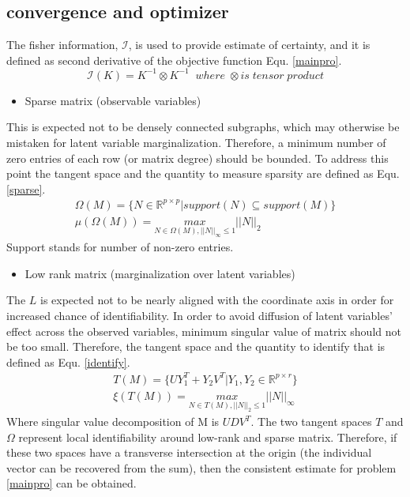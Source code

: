 \documentclass[10pt,conference]{IEEEtran}
\begin{document}
\subsection{convergence and optimizer}
\label{converge}
The fisher information, $\mathcal{I}$, is used to provide estimate of certainty, and it is defined as second derivative of the objective function Equ. \ref{mainpro}.
\begin{equation} \nonumber
    \mathcal{I} (K) = K^{-1} \otimes K^{-1} \;\; where \; \otimes is \; tensor\; product
\end{equation}
\begin{itemize}
\item Sparse matrix (observable variables)
\end{itemize}
This is expected not to be densely connected subgraphs, which may otherwise be mistaken for latent variable marginalization. Therefore, a minimum number of zero entries of each row (or matrix degree) should be bounded. To address this point the tangent space and the quantity to measure sparsity are defined as Equ. \ref{sparse}.
\begin{align}
    \Omega(M) = \{ N \in  \mathbb{R}^{p \times p} |  support(N) \subseteq support(M)\}\nonumber\\
    \mu(\Omega(M)) = \underset{N \in \Omega(M), ||N||_{\infty} \leq 1}{max} || N ||_{2} \label{sparse}
\end{align}
Support stands for number of non-zero entries.
\begin{itemize}
\item Low rank matrix (marginalization over latent variables)
\end{itemize}
The $L$ is expected not to be nearly aligned with the coordinate axis in order for increased chance of identifiability. In order to avoid diffusion of latent variables' effect across the observed variables, minimum singular value of matrix should not be too small. Therefore, the tangent space and the quantity to identify that is defined as Equ. \ref{identify}.
\begin{align}
     T(M) = \{ U Y_1^T + Y_2 V^T | Y_1 , Y_2 \in \mathbb{R}^{p \times r}\} \nonumber\\
     \xi(T(M)) = \underset{N \in T(M), ||N||_2 \leq 1}{max} || N ||_{\infty} \label{identify}
\end{align}
Where singular value decomposition of M is $U D V^T$.
The two tangent spaces $T$ and $\Omega$ represent local identifiability around low-rank and sparse matrix. Therefore, if these two spaces have a transverse intersection at the origin (the individual vector can be recovered from the sum), then the consistent estimate for problem \ref{mainpro} can be obtained.
\end{document}
